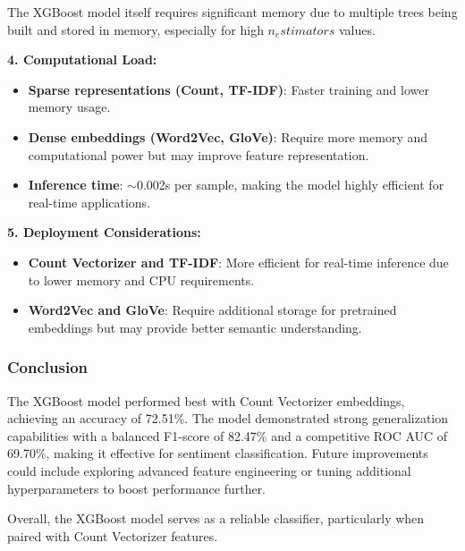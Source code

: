 The XGBoost model itself requires significant memory due to multiple trees being built and stored in memory, especially for high $n_estimators$ values.

\textbf{4. Computational Load:}

\begin{itemize}
\item \textbf{Sparse representations (Count, TF-IDF)}: Faster training and lower memory usage.

\item \textbf{Dense embeddings (Word2Vec, GloVe)}: Require more memory and computational power but may improve feature representation.

\item \textbf{Inference time}: $\sim$0.002s per sample, making the model highly efficient for real-time applications.
\end{itemize}

\textbf{5. Deployment Considerations:}

\begin{itemize}
\item \textbf{Count Vectorizer and TF-IDF}: More efficient for real-time inference due to lower memory and CPU requirements.

\item \textbf{Word2Vec and GloVe}: Require additional storage for pretrained embeddings but may provide better semantic understanding.
\end{itemize}


\subsubsection{Conclusion}

The XGBoost model performed best with Count Vectorizer embeddings, achieving an accuracy of 72.51\%. The model demonstrated strong generalization capabilities with a balanced F1-score of 82.47\% and a competitive ROC AUC of 69.70\%, making it effective for sentiment classification. Future improvements could include exploring advanced feature engineering or tuning additional hyperparameters to boost performance further.

Overall, the XGBoost model serves as a reliable classifier, particularly when paired with Count Vectorizer features.

\newpage